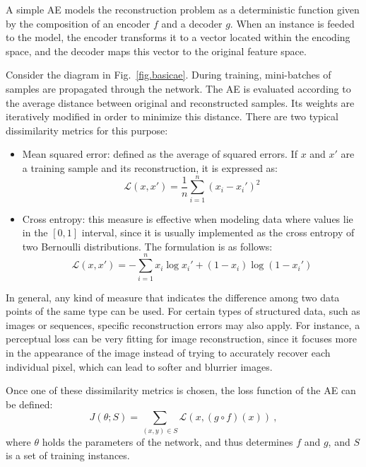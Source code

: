 \documentclass[
	fontsize=11pt, %
	twoside=false, %
	open=any, %
	secnumdepth=1, %
]{kaobook}
\newcommand{\change}[1]{{\color{blue}#1}}
\renewcommand{\change}[1]{#1}
\begin{document}
A simple AE models the reconstruction problem as a deterministic function given by the composition of an encoder $f$ and a decoder $g$. When an instance is feeded to the model, the encoder transforms it to a vector located within the encoding space, and the decoder maps this vector to the original feature space.

Consider the diagram in Fig.~\ref{fig.basicae}. During training, mini-batches of samples are propagated through the network. The AE is evaluated according to the average distance between original and reconstructed samples. Its weights are iteratively modified in order to minimize this distance. There are two typical dissimilarity metrics for this purpose:

\begin{itemize}
  \item Mean squared error: defined as the average of squared errors. \change{If $x$ and $x'$ are a training sample and its reconstruction, it is expressed as:} \begin{equation}\mathcal L(x,x')=\frac 1 n \sum_{i=1}^n(x_i - x_i')^2\end{equation}
  \item Cross entropy: this measure is effective when modeling data where values lie in the $[0,1]$ interval, since it is usually implemented as the cross entropy of two Bernoulli distributions. The formulation is as follows: \begin{equation}\mathcal L(x,x')= -\sum_{i=1}^n x_i\log x_i'  + (1-x_i)\log(1-x_i') \end{equation}
\end{itemize}

In general, any kind of measure that indicates the difference among two data points of the same type can be used. For certain types of structured data, such as images or sequences, specific reconstruction errors may also apply. For instance, a perceptual loss \cite{johnson2016perceptual} can be very fitting for image reconstruction, since it \change{focuses more in the  appearance of the image instead of} trying to accurately recover each individual pixel, which can lead to softer and blurrier images.

Once one of these dissimilarity metrics is chosen, the loss function of the AE can be defined:
\begin{equation}
  J(\theta;S)=\sum_{(x,y)\in S} \mathcal L(x, (g\circ f)(x))~,
\end{equation}
where $\theta$ holds the parameters of the network, and thus determines $f$ and $g$, and $S$ is a set of training instances.
\end{document}
